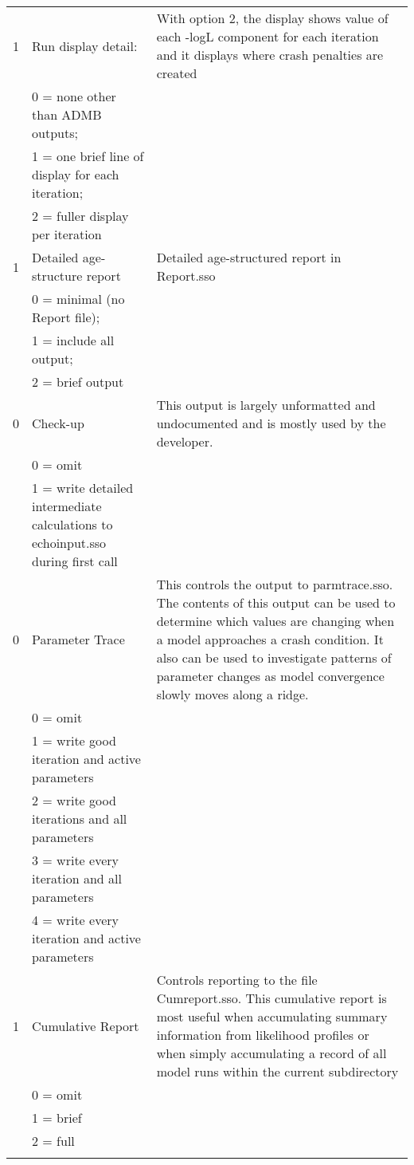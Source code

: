 \begin{landscape}
\begin{longtable}{p{1.5cm} p{7cm} p{12.5cm}}
 \hline
 1 & Run display detail: &  \multirow{1}{1cm}[-0.1cm]{\parbox{12.5cm}{With option 2, the display shows value of each -logL component for each iteration and it displays where crash penalties are created}} \\
   & 0 = none other than ADMB outputs; & \\
   & 1 = one brief line of display for each iteration; & \\
   & 2 = fuller display per iteration & \\
		  
 \hline
 1 & Detailed age-structure report & \multirow{1}{1cm}[-0.1cm]{\parbox{12.5cm}{Detailed age-structured report in Report.sso}} \\
   & 0 = minimal (no Report file); & \\
   & 1 = include all output; &  \\
   & 2 = brief output &  \\		 
		 
 \hline
 0 & Check-up & \multirow{1}{1cm}[-0.1cm]{\parbox{12.5cm}{This output is largely unformatted and undocumented and is mostly used by the developer. }}\\
   & 0 = omit & \\
   & 1 = write detailed intermediate calculations to echoinput.sso during first call & \\

 \pagebreak		
 0 & Parameter Trace & \multirow{1}{1cm}[-0.1cm]{\parbox{12.5cm}{This controls the output to parmtrace.sso. The contents of this output can be used to determine which values are changing when a model approaches a crash condition.  It also can be used to investigate patterns of parameter changes as model convergence slowly moves along a ridge.}} \\
   & 0 = omit & \\
   & 1 = write good iteration and active parameters & \\
   & 2 = write good iterations and all parameters & \\
   & 3 = write every iteration and all parameters & \\
   & 4 = write every iteration and active parameters &  \\
   
 \hline
 1 & Cumulative Report & \multirow{1}{1cm}[-0.1cm]{\parbox{12.5cm}{Controls reporting to the file Cumreport.sso.
 		This cumulative report is most useful when accumulating summary information from likelihood profiles or when simply accumulating a record of all model runs within the current subdirectory}}\\
   & 0 = omit  & \\
   & 1 = brief & \\
   & 2 = full  &  \\
   & & \\
	 

\end{longtable}
\end{landscape}
